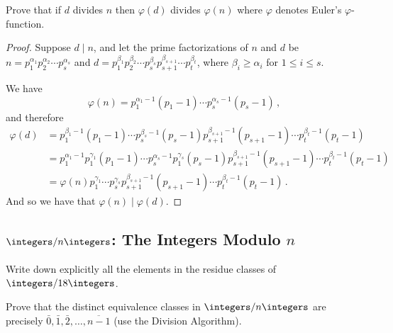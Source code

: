 
\begin{exercise}
	Prove that if $d$ divides $n$ then $\varphi(d)$ divides $\varphi(n)$ where $\varphi$ denotes Euler's $\varphi$-function.
\end{exercise}

\begin{proof}
	Suppose $d \mid n$, and let the prime factorizations of $n$ and 
	$d$ be $n = p_1^{\alpha_1} p_2^{\alpha_2} \cdots 
	p_s^{\alpha_s}$ and $d = p_1^{\beta_1} p_2^{\beta_2} \cdots 
	p_s^{\beta_s}p_{s+1}^{\beta_{s+1}} \cdots p_t^{\beta_t}$, where 
	$\beta_i \geq \alpha_i$ for $1 \leq i \leq s$.
	
	We have
	\[
		\varphi(n) = p_1^{\alpha_1 - 1}(p_1 - 1) \cdots 
		p_s^{\alpha_s - 1}(p_s - 1)\,,
	\]
	and therefore
	\begin{align*}
		\varphi(d) &= p_1^{\beta_1 - 1}(p_1 - 1) \cdots p_s^{\beta_s
			- 1}(p_s - 1) p_{s+1}^{\beta_{s+1} - 1}(p_{s+1} - 1) 
			\cdots p_t^{\beta_t - 1}(p_t - 1) \\
		&= p_1^{\alpha_1 - 1} p_1^{\gamma_1} (p_1 - 1) \cdots 
			p_s^{\alpha_s - 1} p_1^{\gamma_s} (p_s - 1)
			p_{s+1}^{\beta_{s+1} - 1}(p_{s+1} - 1) \cdots 
			p_t^{\beta_t - 1}(p_t - 1) \\
		&= \varphi(n) p_1^{\gamma_1} \cdots p_s^{\gamma_s} 
			p_{s+1}^{\beta_{s+1} - 1}(p_{s+1} - 1) \cdots 
			p_t^{\beta_t - 1}(p_t - 1)\,.
	\end{align*}	
	And so we have that $\varphi(n) \mid \varphi(d)$.
\end{proof}


\subsection{$\integers/n\integers$: The Integers Modulo $n$}

\begin{exercise}
	Write down explicitly all the elements in the residue classes of $\integers/18\integers$.
\end{exercise}


\begin{exercise}
	Prove that the distinct equivalence classes in $\integers/n\integers$ are precisely $\bar{0}, \bar{1}, \bar{2}, \dots, \overline{n-1}$ (use the Division Algorithm).
\end{exercise}

